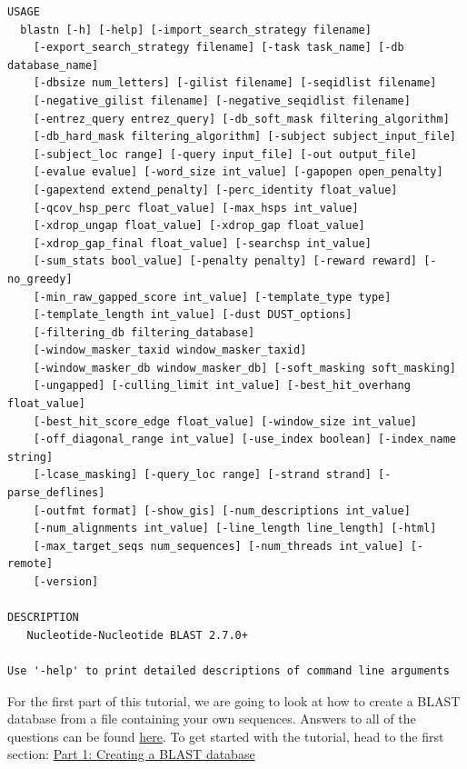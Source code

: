 \documentclass[11pt]{article}
\begin{document}
\begin{verbatim}
USAGE
  blastn [-h] [-help] [-import_search_strategy filename]
    [-export_search_strategy filename] [-task task_name] [-db database_name]
    [-dbsize num_letters] [-gilist filename] [-seqidlist filename]
    [-negative_gilist filename] [-negative_seqidlist filename]
    [-entrez_query entrez_query] [-db_soft_mask filtering_algorithm]
    [-db_hard_mask filtering_algorithm] [-subject subject_input_file]
    [-subject_loc range] [-query input_file] [-out output_file]
    [-evalue evalue] [-word_size int_value] [-gapopen open_penalty]
    [-gapextend extend_penalty] [-perc_identity float_value]
    [-qcov_hsp_perc float_value] [-max_hsps int_value]
    [-xdrop_ungap float_value] [-xdrop_gap float_value]
    [-xdrop_gap_final float_value] [-searchsp int_value]
    [-sum_stats bool_value] [-penalty penalty] [-reward reward] [-no_greedy]
    [-min_raw_gapped_score int_value] [-template_type type]
    [-template_length int_value] [-dust DUST_options]
    [-filtering_db filtering_database]
    [-window_masker_taxid window_masker_taxid]
    [-window_masker_db window_masker_db] [-soft_masking soft_masking]
    [-ungapped] [-culling_limit int_value] [-best_hit_overhang float_value]
    [-best_hit_score_edge float_value] [-window_size int_value]
    [-off_diagonal_range int_value] [-use_index boolean] [-index_name string]
    [-lcase_masking] [-query_loc range] [-strand strand] [-parse_deflines]
    [-outfmt format] [-show_gis] [-num_descriptions int_value]
    [-num_alignments int_value] [-line_length line_length] [-html]
    [-max_target_seqs num_sequences] [-num_threads int_value] [-remote]
    [-version]

DESCRIPTION
   Nucleotide-Nucleotide BLAST 2.7.0+

Use '-help' to print detailed descriptions of command line arguments
\end{verbatim}

For the first part of this tutorial, we are going to look at how to
create a BLAST database from a file containing your own sequences.
Answers to all of the questions can be found
\href{general_question_and_exercise_answers.ipynb}{here}. To get started
with the tutorial, head to the first section:
\href{format_database.ipynb}{Part 1: Creating a BLAST database}





\newpage
\end{document}
